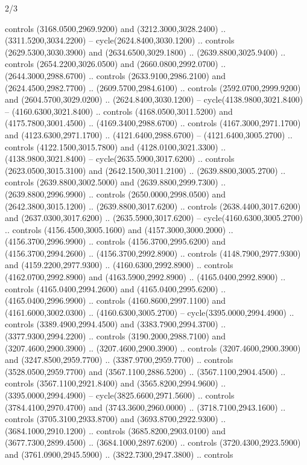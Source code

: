 \begin{flagdescription}{2/3}
\begin{scope}[shift={(0.5\flaglength,0.5)},scale=\flagwidth/130]
\begin{scope}[y=0.01mm, x=0.01mm,shift={(-3365,-2250)}]
  controls (3168.0500,2969.9200) and (3212.3000,3028.2400) ..
  (3311.5200,3034.2200) -- cycle(2624.8400,3030.1200) .. controls
  (2629.5300,3030.3900) and (2634.6500,3029.1800) .. (2639.8800,3025.9400) ..
  controls (2654.2200,3026.0500) and (2660.0800,2992.0700) ..
  (2644.3000,2988.6700) .. controls (2633.9100,2986.2100) and
  (2624.4500,2982.7700) .. (2609.5700,2984.6100) .. controls
  (2592.0700,2999.9200) and (2604.5700,3029.0200) .. (2624.8400,3030.1200) --
  cycle(4138.9800,3021.8400) -- (4160.6300,3021.8400) .. controls
  (4168.0500,3011.5200) and (4175.7800,3001.4500) .. (4169.3400,2988.6700) ..
  controls (4167.3000,2971.1700) and (4123.6300,2971.1700) ..
  (4121.6400,2988.6700) -- (4121.6400,3005.2700) .. controls
  (4122.1500,3015.7800) and (4128.0100,3021.3300) .. (4138.9800,3021.8400) --
  cycle(2635.5900,3017.6200) .. controls (2623.0500,3015.3100) and
  (2642.1500,3011.2100) .. (2639.8800,3005.2700) .. controls
  (2639.8800,3002.5000) and (2639.8800,2999.7300) .. (2639.8800,2996.9900) ..
  controls (2650.0000,2998.0500) and (2642.3800,3015.1200) ..
  (2639.8800,3017.6200) .. controls (2638.4400,3017.6200) and
  (2637.0300,3017.6200) .. (2635.5900,3017.6200) -- cycle(4160.6300,3005.2700)
  .. controls (4156.4500,3005.1600) and (4157.3000,3000.2000) ..
  (4156.3700,2996.9900) .. controls (4156.3700,2995.6200) and
  (4156.3700,2994.2600) .. (4156.3700,2992.8900) .. controls
  (4148.7900,2977.9300) and (4159.2200,2977.9300) .. (4160.6300,2992.8900) ..
  controls (4162.0700,2992.8900) and (4163.5900,2992.8900) ..
  (4165.0400,2992.8900) .. controls (4165.0400,2994.2600) and
  (4165.0400,2995.6200) .. (4165.0400,2996.9900) .. controls
  (4160.8600,2997.1100) and (4161.6000,3002.0300) .. (4160.6300,3005.2700) --
  cycle(3395.0000,2994.4900) .. controls (3389.4900,2994.4500) and
  (3383.7900,2994.3700) .. (3377.9300,2994.2200) .. controls
  (3190.2000,2988.7100) and (3207.4600,2900.3900) .. (3207.4600,2900.3900) ..
  controls (3207.4600,2900.3900) and (3247.8500,2959.7700) ..
  (3387.9700,2959.7700) .. controls (3528.0500,2959.7700) and
  (3567.1100,2886.5200) .. (3567.1100,2904.4500) .. controls
  (3567.1100,2921.8400) and (3565.8200,2994.9600) .. (3395.0000,2994.4900) --
  cycle(3825.6600,2971.5600) .. controls (3784.4100,2970.4700) and
  (3743.3600,2960.0000) .. (3718.7100,2943.1600) .. controls
  (3705.3100,2933.8700) and (3693.8700,2922.9300) .. (3684.1000,2910.1200) ..
  controls (3685.8200,2903.0100) and (3677.7300,2899.4500) ..
  (3684.1000,2897.6200) .. controls (3720.4300,2923.5900) and
  (3761.0900,2945.5900) .. (3822.7300,2947.3800) .. controls

\end{scope}
\end{scope}
\end{flagdescription}
